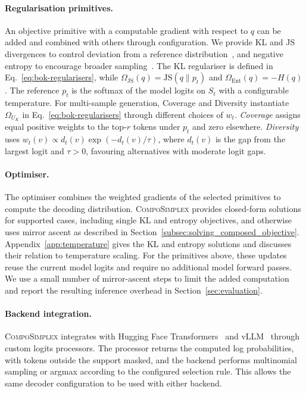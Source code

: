 \documentclass{article} %
\begin{document}
\paragraph{Regularisation primitives.}
An objective primitive with a computable gradient with respect to $q$ can be added and combined with others through configuration. We provide KL and JS divergences to control deviation from a reference distribution~\citep{kullback1951information,lin1991divergence}, and negative entropy to encourage broader sampling~\citep{shannon1948mathematical,jaynes1957information}.
The KL regulariser is defined in Eq.~\ref{eq:bok-regularisers}, while $\Omega_{\mathrm{JS}}(q)=\mathrm{JS}(q\|p_t)$ and $\Omega_{\mathrm{Ent}}(q)=-H(q)$.
The reference $p_t$ is the softmax of the model logits on $S_t$ with a configurable temperature. For multi-sample generation, Coverage and Diversity instantiate $\Omega_{U_K}$ in Eq.~\ref{eq:bok-regularisers} through different choices of $w_t$.
\emph{Coverage} assigns equal positive weights to the top-$r$ tokens under $p_t$ and zero elsewhere.
\emph{Diversity} uses $w_t(v)\propto d_t(v)\exp(-d_t(v)/\tau)$, where $d_t(v)$ is the gap from the largest logit and $\tau>0$, favouring alternatives with moderate logit gaps.

\paragraph{Optimiser.}
The optimiser combines the weighted gradients of the selected primitives to compute the decoding distribution. \textsc{CompoSimplex} provides closed-form solutions for supported cases, including single KL and entropy objectives, and otherwise uses mirror ascent as described in Section~\ref{subsec:solving_composed_objective}. Appendix~\ref{app:temperature} gives the KL and entropy solutions and discusses their relation to temperature scaling. For the primitives above, these updates reuse the current model logits and require no additional model forward passes. We use a small number of mirror-ascent steps to limit the added computation and report the resulting inference overhead in Section~\ref{sec:evaluation}.

\paragraph{Backend integration.}
\textsc{CompoSimplex} integrates with Hugging Face Transformers~\citep{wolf2019huggingface} and vLLM~\citep{kwon2023efficient} through custom logits processors.
The processor returns the computed log probabilities, with tokens outside the support masked, and the backend performs multinomial sampling or argmax according to the configured selection rule.
This allows the same decoder configuration to be used with either backend.
\end{document}
